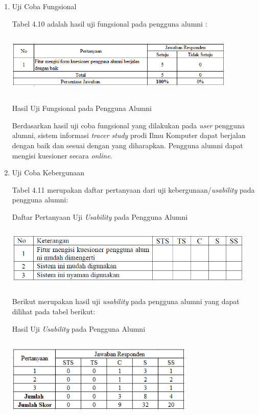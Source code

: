 \begin{enumerate}
	\item Uji Coba Fungsional
	
	Tabel 4.10 adalah hasil uji fungsional pada pengguna alumni :
	
	\begin{table}[H]
		\centering
		\includegraphics[width=11cm,height=3cm]{gambar/UAT/f_pengguna}
		\caption{Hasil Uji Fungsional pada Pengguna Alumni}
		\label{f_pengguna}
	\end{table}
	
	Berdasarkan hasil uji coba fungsional yang dilakukan pada \textit{user} pengguna alumni, sistem informasi
	\textit{tracer study} prodi Ilmu Komputer dapat berjalan dengan baik dan sesuai dengan yang diharapkan. Pengguna alumni dapat mengisi kuesioner secara \textit{online}.
	
	\item Uji Coba Kebergunaan
	
	Tabel 4.11 merupakan daftar pertanyaan dari uji kebergunaan/\textit{usability} pada pengguna alumni:
	
	\begin{table}[H]
		\centering
		\caption{Daftar Pertanyaan Uji \textit{Usability} pada Pengguna Alumni}
		\includegraphics[width=12cm,height=3cm]{gambar/UAT/u_pengguna}
		\label{u_pengguna}
	\end{table}
	
	Berikut merupakan hasil uji \textit{usability} pada pengguna alumni yang dapat dilihat pada tabel berikut:
	
	\begin{table}[H]
		\centering
		\caption{Hasil Uji \textit{Usability} pada Pengguna Alumni}
		\includegraphics[width=9cm,height=4cm]{gambar/UAT/hasil_u_pengguna}
		\label{h_u_pengguna}
	\end{table}
	

\end{enumerate}
